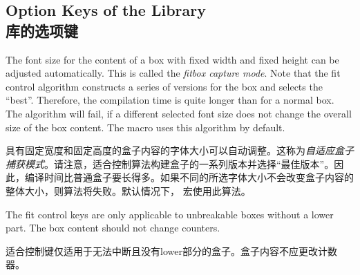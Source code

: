 \subsection{Option Keys of the Library\\库的选项键}\label{subsec:fit}


The font size for the content of a box with fixed width and fixed height
can be adjusted automatically. This is called the \emph{fitbox capture mode}.
Note that the fit control algorithm
constructs a series of versions for the box and selects the \enquote{best}.
Therefore, the compilation time is quite longer than for a normal box.
The algorithm will fail, if a different selected font size does not change the
overall size of the box content.
The  macro uses this algorithm by default.

具有固定宽度和固定高度的盒子内容的字体大小可以自动调整。这称为\emph{自适应盒子捕获模式}。请注意，适合控制算法构建盒子的一系列版本并选择\enquote{最佳版本}。因此，编译时间比普通盒子要长得多。如果不同的所选字体大小不会改变盒子内容的整体大小，则算法将失败。默认情况下， 宏使用此算法。
\medskip
\begin{marker}
The fit control keys are only applicable to unbreakable boxes without
a lower part.
The box content should not change counters.

适合控制键仅适用于无法中断且没有lower部分的盒子。盒子内容不应更改计数器。
\end{marker}


